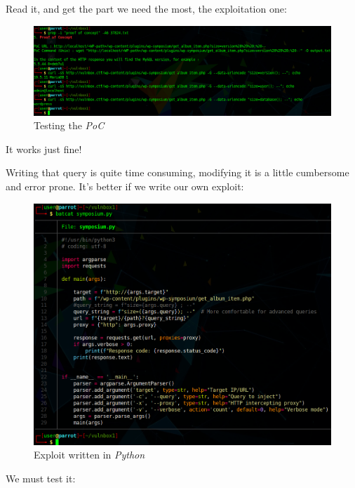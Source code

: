 \documentclass[12pt]{article}
\begin{document}
    Read it, and get the part we need the most, the exploitation one:

    \begin{figure}[H]\label{pic:23-grep-PoC}
        \centering
        \includegraphics[width=1.00\textwidth]{23-grep-PoC.png}
        \caption{Testing the \textit{PoC}}
    \end{figure}

    It works just fine!

    Writing that query is quite time consuming, modifying it is a little
    cumbersome and error prone. It's better if we write our own exploit:

    \begin{figure}[H]\label{pic:24-batcat-exploit}
        \centering
        \includegraphics[width=1.00\textwidth]{24-batcat-exploit.png}
        \caption{Exploit written in \textit{Python}}
    \end{figure}

    We must test it:
\end{document}
